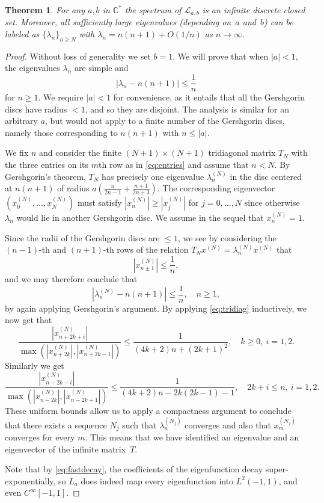 \documentclass[12pt]{amsart}
\theoremstyle{plain}
\newtheorem{theorem}{Theorem}[section]
\numberwithin{equation}{section}
\theoremstyle{definition}
\newcommand{\C}{\mathbb{C}}
\begin{document}
\begin{theorem}\label{thm:spectrum}
	For any $a,b$ in $\C^{*}$ the spectrum of $\mathcal{L}_{a,b}$ is an infinite discrete closed set. Moreover, all sufficiently large eigenvalues (depending on~$a$ and~$b$) can be labeled as $\{\lambda_n\}_{n\ge N}$ with $\lambda_n=n(n+1)+O(1/n)$ as $n\to\infty$.
\end{theorem}
\begin{proof}
Without loss of generality we set $b=1$. We will prove that when $|a| < 1$, the eigenvalues $\lambda_n$ are simple and
\[ |\lambda_n-n(n+1)| \le \frac{1}{n}  \]
for $n\ge 1$.
We require $|a| < 1$ for convenience, as it entails that all the Gershgorin discs have radius $< 1$, and so they are disjoint. The analysis is similar for an arbitrary $a$, but would not  apply to a finite number of the Gershgorin discs, namely those corresponding to $n(n+1)$ with $n\le |a|$.

We fix $n$ and consider the finite $(N+1)\times (N+1)$ tridiagonal matrix $T_N$ with the three entries on its $m$th row as in \eqref{eq:entries} and assume that $n<N$. By Gershgorin's theorem, $T_N$  has precisely one eigenvalue $\lambda_n^{(N)}$ in the disc centered at $n(n+1)$ of radius $a (\frac{n}{2n-1}+\frac{n+1}{2n+3})$. The corresponding eigenvector $(x_0^{(N)},\ldots , x_N^{(N)})$ must satisfy $|x_n^{(N)}|\ge |x_j^{(N)}|$ for $j=0,\dots,N$ since otherwise $\lambda_n$ would lie in another Gershgorin disc. We assume in the sequel that $x_n^{(N)}=1$.

Since the radii of the Gershgorin discs are $\le 1$, we see by considering the $(n-1)$-th and $(n+1)$-th rows of the relation $T_Nx^{(N)}=\lambda_n^{(N)} x^{(N)}$ that
\[ |x_{n\pm 1}^{(N)}|\le \frac{1}{n}, \]
and we may therefore conclude that
\[ |\lambda_n^{(N)}-n(n+1)|\le \frac{1}{n} , \quad n\ge 1, \]
by again applying Gershgorin's argument. By applying \eqref{eq:tridiag} inductively, we now get that
\begin{equation} \label{eq:fastdecay} \frac{|x_{n+2k+i}^{(N)}|}{\max(|x_{n+2k}^{(N)}|, |x_{n+2k-1}^{(N)}|)} \le \frac{1}{(4k+2)n+(2k+1)^2}, \quad k\ge 0, \ i=1,2. \end{equation}
Similarly we get
\[ \frac{|x_{n-2k-i}^{(N)}|}{\max(|x_{n-2k}^{(N)}|, |x_{n-2k+1}^{(N)}|)} \le \frac{1}{(4k+2)n-2k(2k-1)-1}, \quad 2k+i \le n,  \ i=1,2. \]
These uniform bounds allow us to apply a compactness argument to conclude that there exists a sequence $N_j$ such that
$\lambda_n^{(N_j)}$ converges and also that $x_m^{(N_j)}$ converges for every $m$. This means that we have identified an eigenvalue and an eigenvector of the infinite matrix~$T$.

Note that by \eqref{eq:fastdecay}, the coefficients of the eigenfunction decay super-exponentially, so $L_a$ does indeed map every eigenfunction into $L^2(-1,1)$, and even $C^{\infty}[-1,1]$.
\end{proof}
\end{document}
